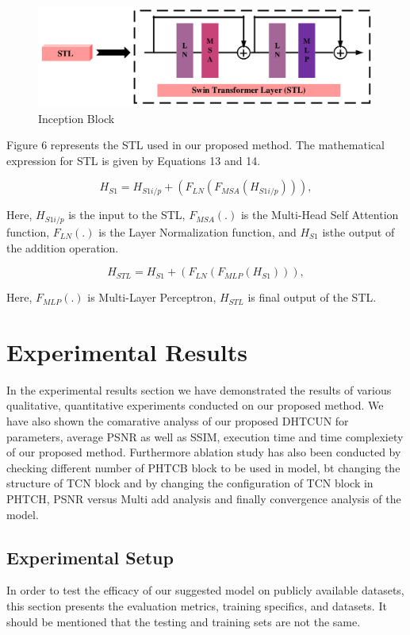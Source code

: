 \documentclass{ieeeaccess}
\begin{document}
\begin{figure}[ht]
  \includegraphics[width=\linewidth]{6FIGURE.pdf}
  \caption{ Inception Block }
  \label{fig:6}
\end{figure}

Figure 6 represents the STL used in our proposed method.  The mathematical expression for STL is given by Equations 13 and 14.

\begin{equation}
{H_{S1}}= {H_{S1{i/p}}} + ({F_{LN}}({F_{MSA}}({H_{S1{i/p}}}))),
\end{equation}

Here, ${H_{S1{i/p}}}$ is the input to the STL, ${F_{MSA}}$$(.)$ is the Multi-Head Self Attention function, ${F_{LN}}$$(.)$ is the Layer Normalization function, and ${H_{S1}}$ isthe output of the addition operation.

\begin{equation}
{H_{STL}}= {H_{S1}} + ({F_{LN}}({F_{MLP}}({H_{S1}}))),
\end{equation}

Here, ${F_{MLP}}$$(.)$ is Multi-Layer Perceptron, ${H_{STL}}$ is final output of the STL.


\section{Experimental Results}

In the experimental results section we have demonstrated the results of various qualitative, quantitative experiments conducted on our proposed method. We have also shown the comarative analyss of our proposed DHTCUN for parameters, average PSNR as well as SSIM, execution time and time complexiety of our proposed method. Furthermore ablation study has also been conducted by checking different number of PHTCB block to be used in model, bt changing the structure of TCN block and by changing the configuration of TCN block in PHTCH, PSNR versus Multi add analysis and finally convergence analysis of the model.

\subsection{Experimental Setup} 
In order to test the efficacy of our suggested model on publicly available datasets, this section presents the evaluation metrics, training specifics, and datasets. It should be mentioned that the testing and training sets are not the same. 
\end{document}

